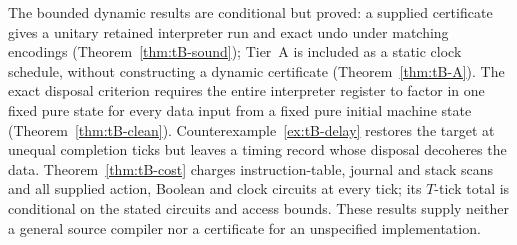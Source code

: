 The bounded dynamic results are conditional but proved: a supplied certificate gives a unitary retained interpreter run and exact undo under matching encodings (Theorem~\ref{thm:tB-sound}); Tier~A is included as a static clock schedule, without constructing a dynamic certificate (Theorem~\ref{thm:tB-A}). The exact disposal criterion requires the entire interpreter register to factor in one fixed pure state for every data input from a fixed pure initial machine state (Theorem~\ref{thm:tB-clean}). Counterexample~\ref{ex:tB-delay} restores the target at unequal completion ticks but leaves a timing record whose disposal decoheres the data. Theorem~\ref{thm:tB-cost} charges instruction-table, journal and stack scans and all supplied action, Boolean and clock circuits at every tick; its $T$-tick total is conditional on the stated circuits and access bounds. These results supply neither a general source compiler nor a certificate for an unspecified implementation.

